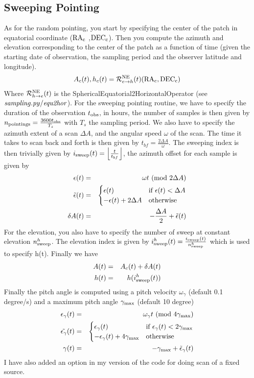 \documentclass[a4paper, 11pt]{article}
\def\ba{\begin{eqnarray}}
\def\ea{\end{eqnarray}}
\begin{document}
\subsection{Sweeping Pointing}
As for the random pointing, you start by specifying the center of the patch in equatorial coordinate (${\rm{RA_c}}$ ,${\rm{DEC_c}}$).
Then you compute the azimuth and elevation corresponding to the center of the patch as a function of time (given the starting date of observation, the sampling period and the observer latitude and longitude). 
\ba
A_{c}(t), h_{c}(t)=  {\cal R}^{\rm NE}_{e \rightarrow h} (t) ({\rm{RA_c}} ,{\rm{DEC_c}})
\ea
Where ${\cal R}^{\rm NE}_{h \rightarrow e} (t)$ is the SphericalEquatorial2HorizontalOperator (see $\it{sampling.py/equ2hor}$).
For the sweeping pointing routine, we have to specify the duration of the observation $t_{\rm obs}$, in hours, the number of samples is then given by $n_{\rm pointings}=\frac{3600 t_{\rm obs}}{T_{s}}$ with $T_{s}$ the sampling period.
We also have to specify the azimuth extent of a scan  $\Delta A$, and the angular speed $\omega$ of the scan. The time it takes to scan back and forth is then given by $t_{bf}= \frac{2 \Delta A}{\omega}$. The sweeping index is then trivially given by $i_{\rm sweep}(t)= \left \lfloor{\frac{t}{t_{bf}}}\right \rfloor $, the azimuth offset for each sample is  given by
\ba
\epsilon (t)&=& \omega t  \ ({\rm mod} \ 2\Delta A ) \\
\tilde{\epsilon} (t)&=&
  \begin{cases}
    \epsilon (t) & \text{if  $\epsilon (t)< \Delta A$} \\
    -\epsilon (t) +2\Delta A  & \text{otherwise}
  \end{cases} \\
\delta A(t)&=& -\frac{\Delta A}{2}+ \tilde{\epsilon} (t) \\
\ea
For the elevation, you also have to specify the number of sweep at constant elevation  $n^{h}_{\rm sweep}$. The elevation index is given by $i^{h}_{\rm sweep}(t)=\frac{i_{\rm sweep}(t)}{n^{h}_{\rm sweep}}$ which is used to specify h(t).
Finally we have
\ba
A(t)&=& A_{c}(t)+\delta A(t) \\
h(t)&=& h(i^{h}_{\rm sweep}(t))
\ea
Finally the pitch angle is computed using a pitch velocity $\omega_{\gamma}$ (default 0.1 degree/s) and a maximum pitch angle $\gamma_{\rm max}$ (default 10 degree)
\ba
\epsilon_{\gamma} (t)&=& \omega_{\gamma} t  \ ({\rm mod} \ 4\gamma_{\rm max} ) \\
\tilde{\epsilon_{\gamma}} (t)&=&
  \begin{cases}
    \epsilon_{\gamma} (t) & \text{if  $\epsilon_{\gamma} (t)< 2\gamma_{\rm max}$} \\
    -\epsilon_{\gamma} (t) +4\gamma_{\rm max}& \text{otherwise}
  \end{cases} \\
\gamma(t)&=& -\gamma_{\rm max}+ \tilde{\epsilon}_{\gamma} (t) \\
\ea
I have also added an option in my version of the code for doing scan of a fixed source.
\end{document}
